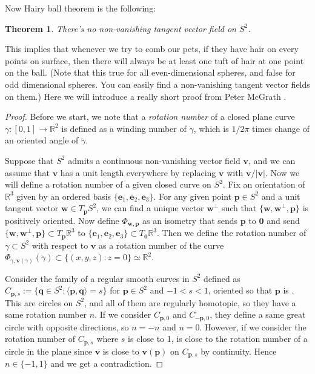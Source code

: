 \documentclass{article}
\newtheorem{theorem}{Theorem}
\begin{document}
Now Hairy ball theorem is the following:
\begin{theorem}
There's no non-vanishing tangent vector field on $S^{2}$. 
\end{theorem}
This implies that whenever we try to comb our pets, if they have hair on every points on surface, then there will always be at least one tuft of hair at one point on the ball. 
(Note that this true for all even-dimensional spheres, and false for odd dimensional spheres. You can easily find a non-vanishing tangent vector fields on them.) 
Here we will introduce a really short proof from Peter McGrath \cite{hbtpf}. 
\begin{proof}
Before we start, we note that a \emph{rotation number} of a closed plane curve $\gamma:[0, 1]\to \mathbb{R}^{2}$ is defined as a winding number of $\dot{\gamma}$, which is $1/2\pi$ times change of an oriented angle of $\dot{\gamma}$. 

Suppose that $S^{2}$ admits a continuous non-vanishing vector field $\mathbf{v}$, and we can assume that $\mathbf{v}$ has a unit length everywhere by replacing $\mathbf{v}$ with $\mathbf{v}/\mathbf{|v|}$. 
Now we will define a rotation number of a given closed curve on $S^{2}$. Fix an orientation of $\mathbb{R}^{3}$ given by an ordered basis $\{\mathbf{e}_{1}, \mathbf{e}_{2}, \mathbf{e}_{3}\}$. 
For any given point $\mathbf{p}\in S^{2}$ and a unit tangent vector $\mathbf{w}\in T_{\mathbf{p}}S^{2}$, we can find a unique vector $\mathbf{w}^{\perp}$ such that $\{\mathbf{w}, \mathbf{w}^{\perp}, \mathbf{p}\}$ is positively oriented. 
Now define $\Phi_{\mathbf{w}, \mathbf{p}}$ as an isometry that sends $\mathbf{p}$ to $\mathbf{0}$ and send $\{\mathbf{w}, \mathbf{w}^{\perp}, \mathbf{p}\}\subset T_{\mathbf{p}}\mathbb{R}^{3}$ to $\{\mathbf{e}_{1}, \mathbf{e}_{2}, \mathbf{e}_{3}\}\subset T_{\mathbf{0}}\mathbb{R}^{3}$. 
Then we define the rotation number of $\gamma\subset S^{2}$ with respect to $\mathbf{v}$ as a rotation number of the curve $\Phi_{\gamma, \mathbf{v}(\gamma)}(\dot{\gamma})\subset \{(x, y, z):z=0\}\simeq \mathbb{R}^{2}$.

Consider the family of a regular smooth curves in $S^{2}$ defined as $C_{\mathbf{p}, s}:=\{\mathbf{q}\in S^{2}:\langle \mathbf{p}, \mathbf{q}\rangle = s\}$ for $\mathbf{p}\in S^{2}$ and $-1<s<1$, oriented so that $\mathbf{p}$ is . This are circles on $S^{2}$, and all of them are regularly homotopic, so they have a same rotation number $n$. 
If we consider $C_{\mathbf{p}, 0}$ and $C_{-\mathbf{p}, 0}$, they define a same great circle with opposite directions, so $n = -n$ and $n=0$. 
However, if we consider the rotation number of $C_{\mathbf{p}, s}$ where $s$ is close to 1, is close to the rotation number of a circle in the plane since $\mathbf{v}$ is close to $\mathbf{v(p)}$ on $C_{\mathbf{p}, s}$ by continuity. Hence $n\in \{-1, 1\}$ and we get a contradiction. 
\end{proof}
\end{document}
